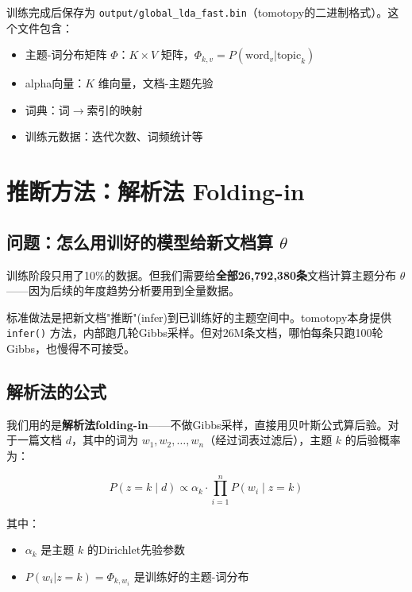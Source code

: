 \documentclass[12pt,a4paper]{ctexart}
\begin{document}
训练完成后保存为 \texttt{output/global\_lda\_fast.bin}（tomotopy的二进制格式）。这个文件包含：

\begin{itemize}
\item 主题-词分布矩阵 $\Phi$：$K \times V$ 矩阵，$\Phi_{k,v} = P(\text{word}_v | \text{topic}_k)$
\item alpha向量：$K$ 维向量，文档-主题先验
\item 词典：词$\to$索引的映射
\item 训练元数据：迭代次数、词频统计等
\end{itemize}


\section{推断方法：解析法 Folding-in}
\label{sec:inference}

\subsection{问题：怎么用训好的模型给新文档算 $\theta$}

训练阶段只用了10\%的数据。但我们需要给\textbf{全部26,792,380条}文档计算主题分布 $\theta$——因为后续的年度趋势分析要用到全量数据。

标准做法是把新文档"推断"(infer)到已训练好的主题空间中。tomotopy本身提供 \texttt{infer()} 方法，内部跑几轮Gibbs采样。但对26M条文档，哪怕每条只跑100轮Gibbs，也慢得不可接受。

\subsection{解析法的公式}

我们用的是\textbf{解析法folding-in}——不做Gibbs采样，直接用贝叶斯公式算后验。对于一篇文档 $d$，其中的词为 $w_1, w_2, \dots, w_n$（经过词表过滤后），主题 $k$ 的后验概率为：

\begin{equation}
P(z = k \mid d) \propto \alpha_k \cdot \prod_{i=1}^{n} P(w_i \mid z = k)
\label{eq:standard-foldin}
\end{equation}

其中：
\begin{itemize}
\item $\alpha_k$ 是主题 $k$ 的Dirichlet先验参数
\item $P(w_i | z=k) = \Phi_{k, w_i}$ 是训练好的主题-词分布
\end{itemize}
\end{document}
